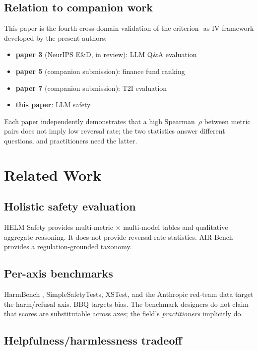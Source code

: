 \documentclass[10pt]{article}
\begin{document}
\subsection{Relation to companion work}

This paper is the fourth cross-domain validation of the criterion-
as-IV framework developed by the present authors:

\begin{itemize}
\item \textbf{paper 3} (NeurIPS E\&D, in review): LLM Q\&A evaluation
\item \textbf{paper 5} (companion submission): finance fund ranking
\item \textbf{paper 7} (companion submission): T2I evaluation
\item \textbf{this paper}: LLM safety
\end{itemize}

Each paper independently demonstrates that a high Spearman~$\rho$
between metric pairs does not imply low reversal rate; the two
statistics answer different questions, and practitioners need the
latter.

\section{Related Work}

\subsection{Holistic safety evaluation}

HELM Safety \citep{liang2024helm} provides multi-metric $\times$
multi-model tables and qualitative aggregate reasoning. It does not
provide reversal-rate statistics. AIR-Bench
\citep{zeng2024airbench} provides a regulation-grounded taxonomy.

\subsection{Per-axis benchmarks}

HarmBench \citep{mazeika2024harmbench}, SimpleSafetyTests, XSTest,
and the Anthropic red-team data target the harm/refusal axis. BBQ
\citep{parrish2022bbq} targets bias. The benchmark designers do not
claim that scores are substitutable across axes; the field's
\emph{practitioners} implicitly do.

\subsection{Helpfulness/harmlessness tradeoff}
\end{document}
